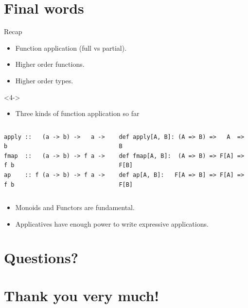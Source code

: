 \documentclass[presentation,aspectratio=169,smaller]{beamer}
\begin{document}
\section*{Final words}
\label{sec:org1174614}
\begin{frame}[label={sec:org6327a07},fragile]{Recap}
 \begin{onlyenv}
\begin{itemize}
\item <1-> Function application (full vs partial).
\item <2-> Higher order functions.
\item <3-> Higher order types.
\end{itemize}
\end{onlyenv}

\begin{onlyenv}<4->
\begin{itemize}
\item Three kinds of function application so far
\end{itemize}

\begin{columns}
\begin{column}{0.35\columnwidth}
\begin{verbatim}
apply ::   (a -> b) ->   a ->   b
fmap  ::   (a -> b) -> f a -> f b
ap    :: f (a -> b) -> f a -> f b
\end{verbatim}
\end{column}

\begin{column}{0.35\columnwidth}
\begin{verbatim}
def apply[A, B]: (A => B) =>   A  =>   B
def fmap[A, B]:  (A => B) => F[A] => F[B]
def ap[A, B]:   F[A => B] => F[A] => F[B]
\end{verbatim}
\end{column}
\end{columns}
\end{onlyenv}

\begin{onlyenv}
\begin{itemize}
\item <5-> Monoids and Functors are fundamental.
\item <6-> Applicatives have enough power to write expressive applications.
\end{itemize}
\end{onlyenv}
\end{frame}

\section{Questions?}
\label{sec:org86b1556}

\section{Thank you very much!}
\label{sec:org6995510}
\end{document}
